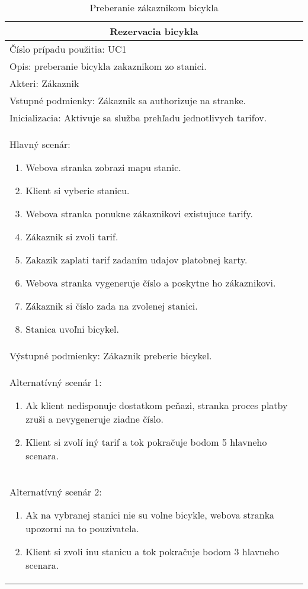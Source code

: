 \begin{table}[h]
  \centering
  \begin{tabular}{|p{12cm}|}
   \hline
   \multicolumn{1}{|c|}{ \textbf{Rezervacia bicykla}} \\
   \hline
   Číslo prípadu použitia: UC1\\
   \hline
   Opis: preberanie bicykla zakaznikom zo stanici.\\
   \hline
   Akteri: Zákaznik\\
   \hline
   Vstupné podmienky: Zákaznik sa authorizuje na stranke.\\
   \hline
   Inicializacia: Aktivuje sa služba prehľadu jednotlivych tarifov.\\
   \hline
   Hlavný scenár:
   \begin{enumerate} 
       \item Webova stranka zobrazi mapu stanic.
       \item Klient si vyberie stanicu.
       \item Webova stranka ponukne zákaznikovi existujuce tarify.
       \item Zákaznik si zvoli tarif. 
       \item Zakazik zaplati tarif zadaním udajov platobnej karty.
       \item Webova stranka vygeneruje číslo a poskytne ho zákaznikovi.
       \item Zákaznik si číslo zada na zvolenej stanici.
       \item Stanica uvoľni bicykel.
   \end{enumerate}\\
   \hline
   Výstupné podmienky: Zákaznik preberie bicykel.\\
   \hline
   Alternatívný scenár 1:
   \begin{enumerate} 
       \item Ak klient nedisponuje dostatkom peňazi, stranka proces
             platby zruši a nevygeneruje ziadne číslo. 
       \item Klient si zvolí iný tarif a tok pokračuje bodom 5 hlavneho scenara.
   \end{enumerate}\\
   \hline
   Alternatívný scenár 2:
   \begin{enumerate} 
       \item Ak na vybranej stanici nie su volne bicykle, webova stranka 
             upozorni na to pouzivatela. 
       \item Klient si zvoli inu stanicu a tok pokračuje bodom 3 hlavneho scenara.
   \end{enumerate}\\
   \hline
  \end{tabular}
  \caption{Preberanie zákaznikom bicykla}
  \label{tab:use_case_steps}
\end{table}

